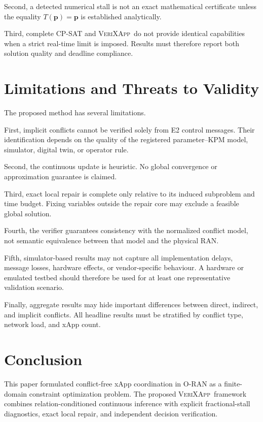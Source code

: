 \documentclass[pdflatex,sn-mathphys-num,iicol,oneside]{sn-jnl}
\newcommand{\method}{\textsc{VeriXApp}}
\begin{document}
Second, a detected numerical stall is not an exact mathematical
certificate unless the equality $T(\bm{p})=\bm{p}$ is established
analytically.

Third, complete CP-SAT and \method\ do not provide identical
capabilities when a strict real-time limit is imposed. Results must
therefore report both solution quality and deadline compliance.

\section{Limitations and Threats to Validity}
\label{sec:limitations}

The proposed method has several limitations.

First, implicit conflicts cannot be verified solely from E2 control
messages. Their identification depends on the quality of the
registered parameter--KPM model, simulator, digital twin, or
operator rule.

Second, the continuous update is heuristic. No global convergence or
approximation guarantee is claimed.

Third, exact local repair is complete only relative to its induced
subproblem and time budget. Fixing variables outside the repair core
may exclude a feasible global solution.

Fourth, the verifier guarantees consistency with the normalized
conflict model, not semantic equivalence between that model and the
physical RAN.

Fifth, simulator-based results may not capture all implementation
delays, message losses, hardware effects, or vendor-specific
behaviour. A hardware or emulated testbed should therefore be used
for at least one representative validation scenario.

Finally, aggregate results may hide important differences between
direct, indirect, and implicit conflicts. All headline results must
be stratified by conflict type, network load, and xApp count.

\section{Conclusion}
\label{sec:conclusion}

This paper formulated conflict-free xApp coordination in O-RAN as a
finite-domain constraint optimization problem. The proposed
\method\ framework combines relation-conditioned continuous
inference with explicit fractional-stall diagnostics, exact local
repair, and independent decision verification.
\end{document}
